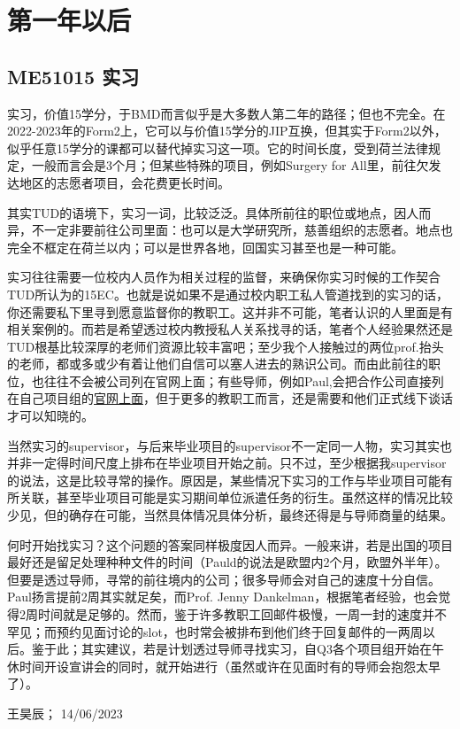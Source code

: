 \section{第一年以后}
\subsection{ME51015 实习}
实习，价值15学分，于BMD而言似乎是大多数人第二年的路径；但也不完全。在2022-2023年的Form2上，它可以与价值15学分的JIP互换，但其实于Form2以外，似乎任意15学分的课都可以替代掉实习这一项。它的时间长度，受到荷兰法律规定，一般而言会是3个月；但某些特殊的项目，例如Surgery for All里，前往欠发达地区的志愿者项目，会花费更长时间。

其实TUD的语境下，实习一词，比较泛泛。具体所前往的职位或地点，因人而异，不一定非要前往公司里面：也可以是大学研究所，慈善组织的志愿者。地点也完全不框定在荷兰以内；可以是世界各地，回国实习甚至也是一种可能。

实习往往需要一位校内人员作为相关过程的监督，来确保你实习时候的工作契合TUD所认为的15EC。也就是说如果不是通过校内职工私人管道找到的实习的话，你还需要私下里寻到愿意监督你的教职工。这并非不可能，笔者认识的人里面是有相关案例的。而若是希望透过校内教授私人关系找寻的话，笔者个人经验果然还是TUD根基比较深厚的老师们资源比较丰富吧；至少我个人接触过的两位prof.抬头的老师，都或多或少有着让他们自信可以塞人进去的熟识公司。而由此前往的职位，也往往不会被公司列在官网上面；有些导师，例如Paul,会把合作公司直接列在自己项目组的\href{https://www.bitegroup.nl/internships/}{\uline{官网上面}}，但于更多的教职工而言，还是需要和他们正式线下谈话才可以知晓的。

当然实习的supervisor，与后来毕业项目的supervisor不一定同一人物，实习其实也并非一定得时间尺度上排布在毕业项目开始之前。只不过，至少根据我supervisor的说法，这是比较寻常的操作。原因是，某些情况下实习的工作与毕业项目可能有所关联，甚至毕业项目可能是实习期间单位派遣任务的衍生。虽然这样的情况比较少见，但的确存在可能，当然具体情况具体分析，最终还得是与导师商量的结果。

何时开始找实习？这个问题的答案同样极度因人而异。一般来讲，若是出国的项目最好还是留足处理种种文件的时间（Pauld的说法是欧盟内2个月，欧盟外半年）。但要是透过导师，寻常的前往境内的公司；很多导师会对自己的速度十分自信。Paul扬言提前2周其实就足矣，而Prof. Jenny Dankelman，根据笔者经验，也会觉得2周时间就是足够的。然而，鉴于许多教职工回邮件极慢，一周一封的速度并不罕见；而预约见面讨论的slot，也时常会被排布到他们终于回复邮件的一两周以后。鉴于此；其实建议，若是计划透过导师寻找实习，自Q3各个项目组开始在午休时间开设宣讲会的同时，就开始进行（虽然或许在见面时有的导师会抱怨太早了）。
\begin{flushright}
王昊辰； 14/06/2023
\end{flushright}

